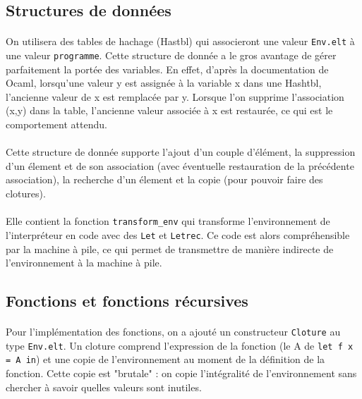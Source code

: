 \subsection{Structures de données}

\paragraph{} On utilisera des tables de hachage (Hastbl) qui associeront une valeur \texttt{Env.elt} à une valeur \texttt{programme}. Cette structure de donnée a le gros avantage de gérer parfaitement la portée des variables. En effet, d'après la documentation de Ocaml, lorsqu'une valeur y est assignée à la variable x dans une Hashtbl, l'ancienne valeur de x est remplacée par y. Lorsque l'on supprime l'association (x,y) dans la table, l'ancienne valeur associée à x est restaurée, ce qui est le comportement attendu.

\paragraph{} Cette structure de donnée supporte l'ajout d'un couple d'élément, la suppression d'un élement et de son association (avec éventuelle restauration de la précédente association), la recherche d'un élement et la copie (pour pouvoir faire des clotures).

\paragraph{} Elle contient la fonction \texttt{transform\_env} qui transforme l'environnement de l'interpréteur en code avec des \texttt{Let} et \texttt{Letrec}. Ce code est alors compréhensible par la machine à pile, ce  qui permet de transmettre de manière indirecte de l'environnement à la machine à pile.

\subsection{Fonctions et fonctions récursives}

\paragraph{} Pour l'implémentation des fonctions, on a ajouté un constructeur \texttt{Cloture} au type \texttt{Env.elt}.  Un cloture comprend l'expression de la fonction (le A de \texttt{let f x = A in}) et une copie de l'environnement au moment de la définition de la fonction. Cette copie est "brutale" : on copie l'intégralité de l'environnement sans chercher à savoir quelles valeurs sont inutiles.

